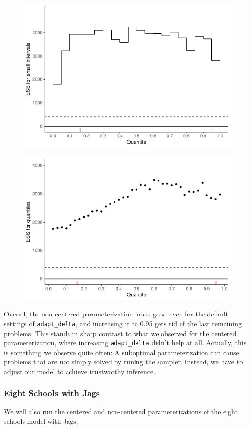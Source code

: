 \documentclass[american,]{article}
\begin{document}
\begin{figure}[tp]
  \centering
  \includegraphics[width=0.6\linewidth]{graphics/local-ess-fit-ncp-tau-1.pdf}
\end{figure}

\begin{figure}[tp]
  \centering
  \includegraphics[width=0.6\linewidth]{graphics/quantile-ess-fit-ncp-tau-1.pdf}
\end{figure}

Overall, the non-centered parameterization looks good even for the
default settings of \texttt{adapt\_delta}, and increasing it to 0.95
gets rid of the last remaining problems. This stands in sharp contrast
to what we observed for the centered parameterization, where increasing
\texttt{adapt\_delta} didn't help at all. Actually, this is something we
observe quite often: A suboptimal parameterization can cause problems
that are not simply solved by tuning the sampler. Instead, we have to
adjust our model to achieve trustworthy inference.

\hypertarget{eight-schools-with-jags}{%
\subsubsection*{Eight Schools with Jags}\label{eight-schools-with-jags}}

We will also run the centered and non-centered parameterizations of the
eight schools model with Jags.
\end{document}
